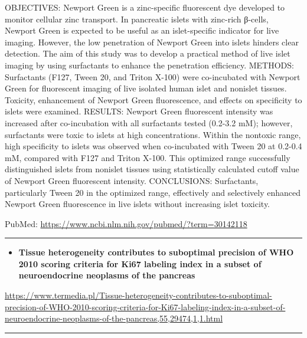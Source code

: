 \documentclass[]{article}
\providecommand{\tightlist}{%
  \setlength{\itemsep}{0pt}\setlength{\parskip}{0pt}}
\begin{document}
OBJECTIVES: Newport Green is a zinc-specific fluorescent dye developed
to monitor cellular zinc transport. In pancreatic islets with zinc-rich
β-cells, Newport Green is expected to be useful as an islet-specific
indicator for live imaging. However, the low penetration of Newport
Green into islets hinders clear detection. The aim of this study was to
develop a practical method of live islet imaging by using surfactants to
enhance the penetration efficiency. METHODS: Surfactants (F127, Tween
20, and Triton X-100) were co-incubated with Newport Green for
fluorescent imaging of live isolated human islet and nonislet tissues.
Toxicity, enhancement of Newport Green fluorescence, and effects on
specificity to islets were examined. RESULTS: Newport Green fluorescent
intensity was increased after co-incubation with all surfactants tested
(0.2-3.2 mM); however, surfactants were toxic to islets at high
concentrations. Within the nontoxic range, high specificity to islets
was observed when co-incubated with Tween 20 at 0.2-0.4 mM, compared
with F127 and Triton X-100. This optimized range successfully
distinguished islets from nonislet tissues using statistically
calculated cutoff value of Newport Green fluorescent intensity.
CONCLUSIONS: Surfactants, particularly Tween 20 in the optimized range,
effectively and selectively enhanced Newport Green fluorescence in live
islets without increasing islet toxicity.

PubMed: \url{https://www.ncbi.nlm.nih.gov/pubmed/?term=30142118}

{}

{}

\begin{center}\rule{0.5\linewidth}{\linethickness}\end{center}

\begin{itemize}
\tightlist
\item
  \textbf{Tissue heterogeneity contributes to suboptimal precision of
  WHO 2010 scoring criteria for Ki67 labeling index in a subset of
  neuroendocrine neoplasms of the pancreas}
\end{itemize}

\url{https://www.termedia.pl/Tissue-heterogeneity-contributes-to-suboptimal-precision-of-WHO-2010-scoring-criteria-for-Ki67-labeling-index-in-a-subset-of-neuroendocrine-neoplasms-of-the-pancreas,55,29474,1,1.html}

\begin{center}\rule{0.5\linewidth}{\linethickness}\end{center}
\end{document}
